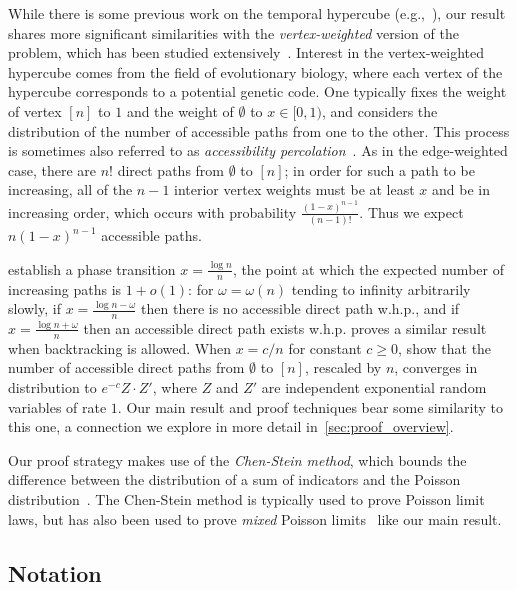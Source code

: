 \documentclass[11pt]{article}
\theoremstyle{definition}
\theoremstyle{remark}
\theoremstyle{remark}
\numberwithin{theorem}{section}
\begin{document}
While there is some previous work on the temporal hypercube (e.g.,~\cite{de2015increasing}), our result shares more significant similarities with the \textit{vertex-weighted} version of the problem, which has been studied extensively~\citep{berestycki2014accessibility,berestycki2016number,kauffman1987towards,kingman1978simple,martinsson2015accessibility}. Interest in the vertex-weighted hypercube comes from the field of evolutionary biology, where each vertex of the hypercube corresponds to a potential genetic code. One typically fixes the weight of vertex $[n]$ to $1$ and the weight of $\emptyset$ to $x\in[0,1)$, and considers the distribution of the number of accessible paths from one to the other. This process is sometimes also referred to as \emph{accessibility percolation}~\citep{martinsson2015accessibility}. As in the edge-weighted case, there are $n!$ direct paths from $\emptyset$ to $[n]$; in order for such a path to be increasing, all of the $n-1$ interior vertex weights must be at least $x$ and be in increasing order, which occurs with probability $\frac{(1-x)^{n-1}}{(n-1)!}$. Thus we expect $n(1-x)^{n-1}$ accessible paths. 

\cite{hegarty2014existence} establish a phase transition $x = \frac{\log n}{n}$, the point at which the expected number of increasing paths is $1 + o(1)$: for $\omega = \omega(n)$ tending to infinity arbitrarily slowly, if $x = \frac{\log n - \omega}{n}$ then there is no accessible direct path w.h.p., and if $x = \frac{\log n + \omega}{n}$ then an accessible direct path exists w.h.p. \cite{li2018phase} proves a similar result when backtracking is allowed. When $x = c/n$ for constant $c\geq 0$, \cite{berestycki2016number} show that the number of accessible direct paths from $\emptyset$ to $[n]$, rescaled by $n$, converges in distribution to $e^{-c}Z\cdot Z'$, where $Z$ and $Z'$ are independent exponential random variables of rate $1$. Our main result and proof techniques bear some similarity to this one, a connection we explore in more detail in~\cref{sec:proof_overview}.

Our proof strategy makes use of the \emph{Chen-Stein method}, which bounds the difference between the distribution of a sum of indicators and the Poisson distribution~\citep{arratia1990poisson}. The Chen-Stein method is typically used to prove Poisson limit laws, but has also been used to prove \emph{mixed} Poisson limits~\citep{reinert2007length} like our main result.


\subsection{Notation}
\end{document}
